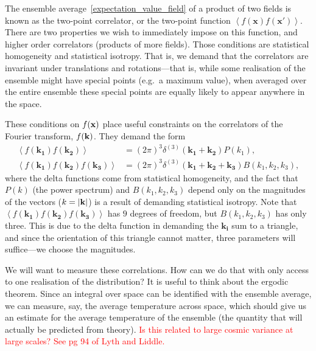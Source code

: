     The ensemble average~\eqref{expectation_value_field} of a product of two fields is known as the
    two-point correlator, or the two-point function $\left<f(\mathbf{x})f(\mathbf{x'})\right>$.
    There are two properties we wish to immediately impose on this function, and higher order correlators
    (products of more fields). Those conditions are statistical homogeneity and statistical isotropy.
    That is, we demand that the correlators are invariant under translations and rotations---that is,
    while some realisation of the ensemble might have special points (e.g.\ a maximum value),
    when averaged over the entire ensemble these special points are equally likely to appear anywhere in
    the space.


    These conditions on $f(\mathbf{x})$ place useful constraints on the correlators of the
    Fourier transform, $f(\mathbf{k})$. They demand the form
    \begin{align}
        \left<f(\mathbf{k_1})f(\mathbf{k_2})\right> &= (2\pi)^3\delta^{(3)}(\mathbf{k_1}+\mathbf{k_2})P(k_1),\\
        \left<f(\mathbf{k_1})f(\mathbf{k_2})f(\mathbf{k_3})\right> &= (2\pi)^3\delta^{(3)}(\mathbf{k_1}+\mathbf{k_2}+\mathbf{k_3})B(k_1,k_2,k_3),
    \end{align}
    where the delta functions come from statistical homogeneity, and the fact that $P(k)$ (the power spectrum)
    and $B(k_1,k_2,k_3)$ depend only on the magnitudes of the vectors ($k=\left|\mathbf{k}\right|$) is a result
    of demanding statistical isotropy. Note that $\left<f(\mathbf{k_1})f(\mathbf{k_2})f(\mathbf{k_3})\right>$
    has $9$ degrees of freedom, but $B(k_1,k_2,k_3)$ has only three. This is due to the delta function in
    demanding the $\mathbf{k_i}$ sum to a triangle, and since the orientation of this triangle cannot matter,
    three parameters will suffice---we choose the magnitudes.


    We will want to measure these correlations. How can we do that with only access to one realisation
    of the distribution? It is useful to think about the ergodic theorem. Since an integral over
    space can be identified with the ensemble average, we can measure, say, the average temperature
    across space, which should give us an estimate for the average temperature of the ensemble
    (the quantity that will actually be predicted from theory).
    \textcolor{red}{Is this related to large cosmic variance at large scales? See pg 94 of Lyth and Liddle.}


